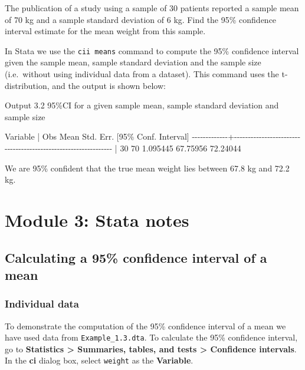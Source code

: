 \documentclass[
]{memoir}
\newenvironment{Shaded}{\begin{snugshade}}{\end{snugshade}}
\newcommand{\NormalTok}[1]{#1}
\begin{document}
The publication of a study using a sample of 30 patients reported a sample mean of 70 kg and a sample standard deviation of 6 kg. Find the 95\% confidence interval estimate for the mean weight from this sample.

In Stata we use the \texttt{cii\ means} command to compute the 95\% confidence interval given the sample mean, sample standard deviation and the sample size (i.e.~without using individual data from a dataset). This command uses the t-distribution, and the output is shown below:

Output 3.2 95\%CI for a given sample mean, sample standard deviation and sample size

\begin{Shaded}
\begin{Highlighting}[]
\NormalTok{    Variable |        Obs        Mean    Std. Err.       [95\% Conf. Interval]}
\NormalTok{{-}{-}{-}{-}{-}{-}{-}{-}{-}{-}{-}{-}{-}+{-}{-}{-}{-}{-}{-}{-}{-}{-}{-}{-}{-}{-}{-}{-}{-}{-}{-}{-}{-}{-}{-}{-}{-}{-}{-}{-}{-}{-}{-}{-}{-}{-}{-}{-}{-}{-}{-}{-}{-}{-}{-}{-}{-}{-}{-}{-}{-}{-}{-}{-}{-}{-}{-}{-}{-}{-}{-}{-}{-}{-}{-}{-}}
\NormalTok{             |         30          70    1.095445        67.75956    72.24044}
\end{Highlighting}
\end{Shaded}

We are 95\% confident that the true mean weight lies between 67.8 kg and 72.2 kg.

\hypertarget{module-3-stata-notes}{%
\chapter*{Module 3: Stata notes}\label{module-3-stata-notes}}

\hypertarget{calculating-a-95-confidence-interval-of-a-mean}{%
\section{Calculating a 95\% confidence interval of a mean}\label{calculating-a-95-confidence-interval-of-a-mean}}

\hypertarget{individual-data}{%
\subsection{Individual data}\label{individual-data}}

To demonstrate the computation of the 95\% confidence interval of a mean we have used data from \texttt{Example\_1.3.dta}. To calculate the 95\% confidence interval, go to \textbf{Statistics \textgreater{} Summaries, tables, and tests \textgreater{} Confidence intervals}. In the \textbf{ci} dialog box, select \texttt{weight} as the \textbf{Variable}.
\end{document}
